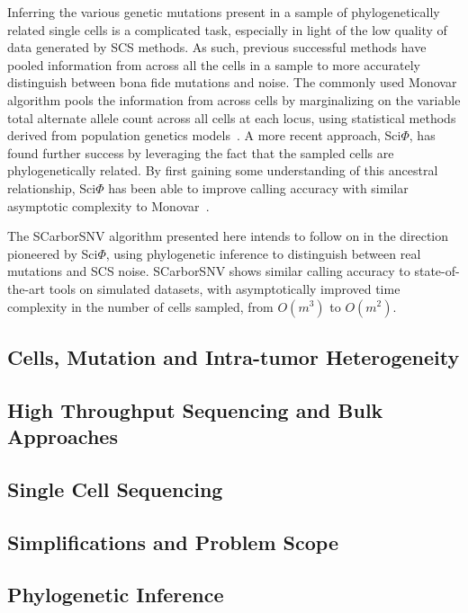\documentclass[../main.tex]{subfiles}
\begin{document}
Inferring the various genetic mutations present in a sample of phylogenetically related single cells is a complicated task, especially in light of the low quality of data generated by SCS methods.
As such, previous successful methods have pooled information from across all the cells in a sample to more accurately distinguish between bona fide mutations and noise.
The commonly used Monovar algorithm pools the information from across cells by marginalizing on the variable total alternate allele count across all cells at each locus, using statistical methods derived from population genetics models~\cite{monovar}.
A more recent approach, Sci$\Phi$, has found further success by leveraging the fact that the sampled cells are phylogenetically related.
By first gaining some understanding of this ancestral relationship, Sci$\Phi$ has been able to improve calling accuracy with similar asymptotic complexity to Monovar~\cite{sciphi}.

The SCarborSNV algorithm presented here intends to follow on in the direction pioneered by Sci$\Phi$, using phylogenetic inference to distinguish between real mutations and SCS noise.
SCarborSNV shows similar calling accuracy to state-of-the-art tools on simulated datasets, with asymptotically improved time complexity in the number of cells sampled, from $O(m^3)$ to $O(m^2)$.

\subsection{Cells, Mutation and Intra-tumor Heterogeneity}


\subsection{High Throughput Sequencing and Bulk Approaches}


\subsection{Single Cell Sequencing}


\subsection{Simplifications and Problem Scope}


\subsection{Phylogenetic Inference}

 
\end{document}
